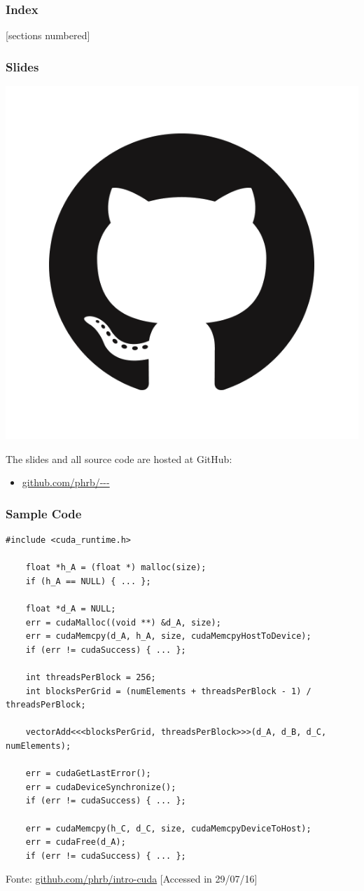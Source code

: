 \documentclass[10pt, compress, aspectratio=169]{beamer}
\begin{document}
\begin{frame}
    \frametitle{Index}
    [sections numbered]
    \tableofcontents[hideallsubsections, part=1]
\end{frame}

\begin{frame}
    \frametitle{Slides}
    \begin{center}
        \includegraphics[width=.18\textwidth]{github}
    \end{center}
    The slides and all source code are hosted at \alert{GitHub}:

    \begin{itemize}
        \item \url{github.com/phrb/---}
    \end{itemize}
\end{frame}

\begin{frame}[fragile]
    \frametitle{Sample Code}
    \begin{lstlisting}[basicstyle=\ttfamily\scriptsize]
    #include <cuda_runtime.h>

    float *h_A = (float *) malloc(size);
    if (h_A == NULL) { ... };

    float *d_A = NULL;
    err = cudaMalloc((void **) &d_A, size);
    err = cudaMemcpy(d_A, h_A, size, cudaMemcpyHostToDevice);
    if (err != cudaSuccess) { ... };

    int threadsPerBlock = 256;
    int blocksPerGrid = (numElements + threadsPerBlock - 1) / threadsPerBlock;

    vectorAdd<<<blocksPerGrid, threadsPerBlock>>>(d_A, d_B, d_C, numElements);

    err = cudaGetLastError();
    err = cudaDeviceSynchronize();
    if (err != cudaSuccess) { ... };

    err = cudaMemcpy(h_C, d_C, size, cudaMemcpyDeviceToHost);
    err = cudaFree(d_A);
    if (err != cudaSuccess) { ... };
    \end{lstlisting}

    \vfill

    \begin{center}
        \tiny{Fonte: \url{github.com/phrb/intro-cuda} [Accessed in 29/07/16]}
    \end{center}
\end{frame}

\maketitle
\end{document}

